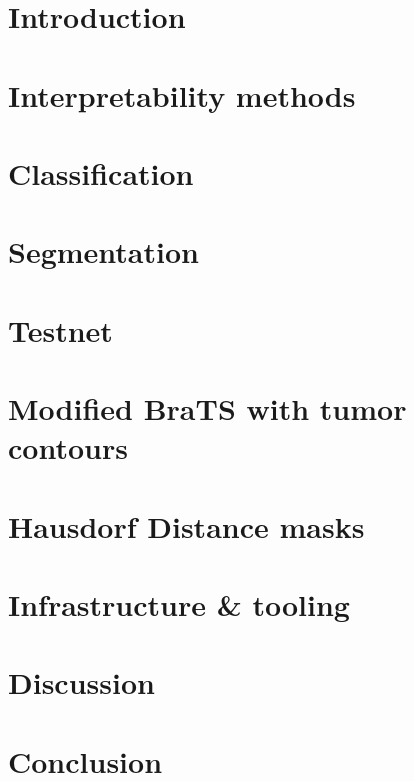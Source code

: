 \chapter{Introduction}


\chapter{Interpretability methods}







\chapter{Classification}



\chapter{Segmentation}


\chapter{Testnet}


\chapter{Modified BraTS with tumor contours}


\chapter{Hausdorf Distance masks}










\chapter{Infrastructure \& tooling}


\chapter{Discussion}


\chapter{Conclusion}

